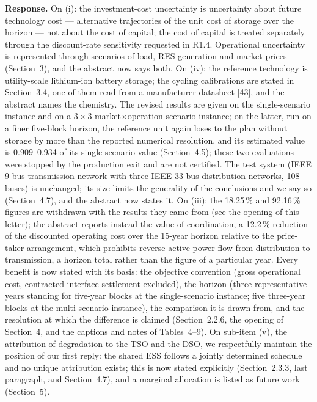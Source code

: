 \documentclass[11pt]{article}
\newcommand{\rresponse}[1]{\noindent\textbf{Response.} #1\par\smallskip}
\begin{document}
\rresponse{
On (i): the investment-cost uncertainty is uncertainty about future technology cost --- alternative trajectories of the unit cost of storage over the horizon --- not about the cost of capital; the cost of capital is treated separately through the discount-rate sensitivity requested in R1.4. Operational uncertainty is represented through scenarios of load, RES generation and market prices (Section~3), and
the abstract now says both. 
On (iv): the reference technology is utility-scale lithium-ion battery storage; the cycling calibrations are stated in Section~3.4, one of them read from a manufacturer datasheet [43], and the abstract names the chemistry. The revised results are given on the single-scenario instance and on a $3\times3$ market$\times$operation scenario instance; 
on the latter, run on a finer five-block horizon, the reference unit again loses to the plan without storage by more than the reported numerical resolution, and its estimated value is 0.909--0.934 of its single-scenario value (Section~4.5); these two evaluations were stopped by the production exit and are not certified. The test system (IEEE 9-bus transmission network with three IEEE 33-bus distribution networks, 108 buses) is unchanged; its size
limits the generality of the conclusions and we say so (Section~4.7), and the abstract now states it.
On (iii): the 18.25\,\% and 92.16\,\% figures are withdrawn with the results they came from (see the opening of this letter); the abstract reports instead the value of coordination, a 12.2\,\% reduction of the discounted operating cost over the 15-year horizon relative to the price-taker arrangement, which prohibits reverse active-power flow from distribution to transmission, a horizon total rather than the figure of a particular year.
Every benefit is now stated with its basis: the objective convention (gross operational cost, contracted interface settlement excluded), the horizon (three representative years standing for five-year blocks at the single-scenario instance; five three-year blocks at the multi-scenario instance), the comparison it is drawn from, and the resolution at which the difference is claimed (Section~2.2.6, the opening of Section~4, and the captions and notes of Tables~4--9).
On sub-item (v), the attribution of degradation to the TSO and the DSO, we respectfully maintain the position of our first reply: the shared ESS follows a jointly determined schedule and no unique attribution exists; this is now stated explicitly (Section~2.3.3, last paragraph, and Section~4.7), and a marginal allocation is listed as future work (Section~5).
}
\end{document}
